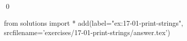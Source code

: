 
\begin{ex}
  \label{ex:17-01-print-strings}
  
  \qed
\end{ex}
\begin{python0}
from solutions import *
add(label="ex:17-01-print-strings",
    srcfilename='exercises/17-01-print-strings/answer.tex')
\end{python0}
